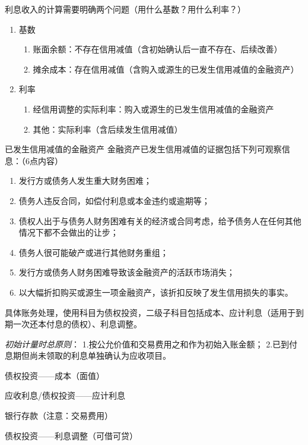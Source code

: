 \documentclass[UTF8,12pt]{ctexart}
\newenvironment{Dr}{%
	\begin{list}{}%
		{
			\setlength{\leftmargin}{2em}
			\setlength{\labelwidth}{2em}
			\setlength{\labelsep}{0pt}
			\setlength{\itemindent}{0pt}
			\setlength{\listparindent}{0pt}
			\setlength{\parsep}{0pt}
			\setlength{\topsep}{0pt}
		}
		\item[\textbf{借：}]
	}{%
	\end{list}
}
\newenvironment{Cr}{%
	\begin{list}{}%
		{
			\setlength{\leftmargin}{3em}
			\setlength{\labelwidth}{2em}
			\setlength{\labelsep}{0pt}
			\setlength{\itemindent}{0pt}
			\setlength{\listparindent}{0pt}
			\setlength{\parsep}{0pt}
			\setlength{\topsep}{0pt}
		}
		\item[\textbf{贷：}]
	}{%
	\end{list}
}
\numberwithin{equation}{section} %
\numberwithin{figure}{section}
\numberwithin{table}{section}
\begin{document}
	利息收入的计算需要明确两个问题（用什么基数？用什么利率？）
	\begin{enumerate}
		\item 基数
		\begin{enumerate}
			\item 账面余额：不存在信用减值（含初始确认后一直不存在、后续改善）
			
			\item 摊余成本：存在信用减值（含购入或源生的已发生信用减值的金融资产）
		\end{enumerate}
		
		\item 利率
		\begin{enumerate}
			\item 经信用调整的实际利率：购入或源生的已发生信用减值的金融资产
			
			\item 其他：实际利率（含后续发生信用减值）
		\end{enumerate}
	\end{enumerate}

	已发生信用减值的金融资产
	金融资产已发生信用减值的证据包括下列可观察信息：（6点内容）
	\begin{enumerate}
		\item 发行方或债务人发生重大财务困难；
		
		\item 债务人违反合同，如偿付利息或本金违约或逾期等；
		
		\item 债权人出于与债务人财务困难有关的经济或合同考虑，给予债务人在任何其他情况下都不会做出的让步；
		
		\item 债务人很可能破产或进行其他财务重组；
		
		\item 发行方或债务人财务困难导致该金融资产的活跃市场消失；
		
		\item 以大幅折扣购买或源生一项金融资产，该折扣反映了发生信用损失的事实。
	\end{enumerate}
	
	具体账务处理，使用科目为债权投资，二级子科目包括成本、应计利息（适用于到期一次还本付息的债权）、利息调整。
	
	\textit{初始计量时总原则}：
	1.按公允价值和交易费用之和作为初始入账金额；
	2.已到付息期但尚未领取的利息单独确认为应收项目。
	
	\begin{Dr}
		债权投资——成本（面值）
		
		应收利息/债权投资——应计利息
	\end{Dr}
	\begin{Cr}
		银行存款（注意：交易费用）
		
		债权投资——利息调整（可借可贷）
	\end{Cr}
	
\end{document}
